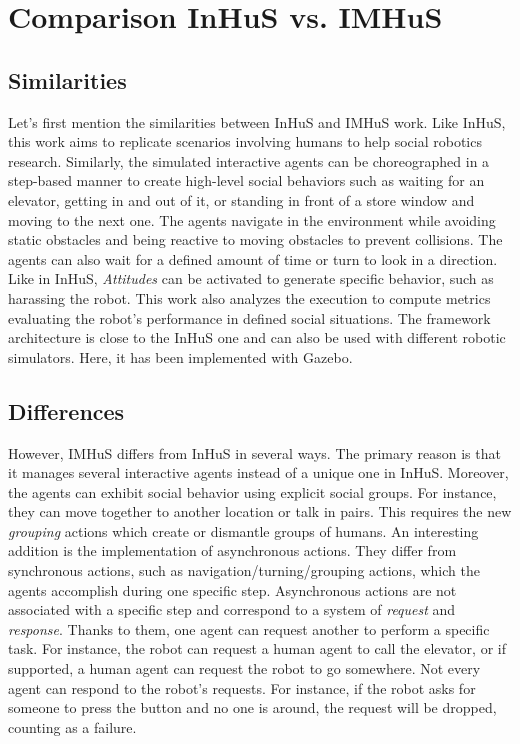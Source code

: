 \section{Comparison InHuS vs. IMHuS}

\subsection{Similarities}

Let's first mention the similarities between InHuS and IMHuS work. Like InHuS, this work aims to replicate scenarios involving humans to help social robotics research. Similarly, the simulated interactive agents can be choreographed in a step-based manner to create high-level social behaviors such as waiting for an elevator, getting in and out of it, or standing in front of a store window and moving to the next one. The agents navigate in the environment while avoiding static obstacles and being reactive to moving obstacles to prevent collisions. The agents can also wait for a defined amount of time or turn to look in a direction. Like in InHuS, \textit{Attitudes} can be activated to generate specific behavior, such as harassing the robot. This work also analyzes the execution to compute metrics evaluating the robot's performance in defined social situations. The framework architecture is close to the InHuS one and can also be used with different robotic simulators. Here, it has been implemented with Gazebo.


\subsection{Differences}
However, IMHuS differs from InHuS in several ways. The primary reason is that it manages several interactive agents instead of a unique one in InHuS. Moreover, the agents can exhibit social behavior using explicit social groups. For instance, they can move together to another location or talk in pairs. This requires the new \textit{grouping} actions which create or dismantle groups of humans. An interesting addition is the implementation of asynchronous actions. They differ from synchronous actions, such as navigation/turning/grouping actions, which the agents accomplish during one specific step. Asynchronous actions are not associated with a specific step and correspond to a system of \textit{request} and \textit{response}. Thanks to them, one agent can request another to perform a specific task. For instance, the robot can request a human agent to call the elevator, or if supported, a human agent can request the robot to go somewhere. Not every agent can respond to the robot's requests. For instance, if the robot asks for someone to press the button and no one is around, the request will be dropped, counting as a failure. 

